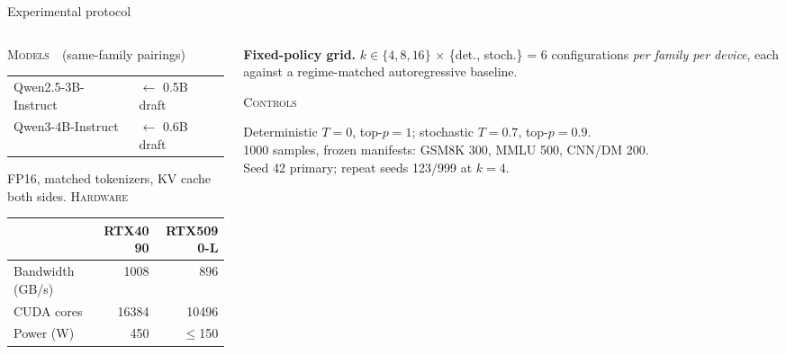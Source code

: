 \documentclass[aspectratio=169, 11pt]{beamer}
\begin{document}
\begin{frame}{Experimental protocol}
  \begin{columns}[T,onlytextwidth]
    \begin{column}{0.47\textwidth}
      {\footnotesize\color{ink2}\textsc{Models}\ \ (same-family pairings)}\par
      \vskip4pt
      {\small
      \begin{tabular}{@{}ll@{}}
        Qwen2.5-3B-Instruct & $\leftarrow$ 0.5B draft\\
        Qwen3-4B-Instruct   & $\leftarrow$ 0.6B draft\\
      \end{tabular}}\par
      \vskip3pt
      {\footnotesize\color{ink2}FP16, matched tokenizers, KV cache both sides.}
      \vskip11pt
      {\footnotesize\color{ink2}\textsc{Hardware}}\par
      \vskip4pt
      {\small
      \begin{tabular}{@{}l@{\hskip 8pt}N@{\hskip 8pt}N@{}}
        \toprule
                          & \textbf{RTX4090} & \textbf{RTX5090-L}\\
        \midrule
        Bandwidth (GB/s)  & 1008 & 896\\
        CUDA cores        & 16384 & 10496\\
        Power (W)         & 450 & $\leq$150\\
        \bottomrule
      \end{tabular}}
    \end{column}
    \begin{column}{0.50\textwidth}
      \begin{takeaway}
        \textbf{Fixed-policy grid.} $k \in \{4,8,16\}$ $\times$ \{det., stoch.\}
        = 6 configurations \emph{per family per device}, each against a
        \alert{regime-matched} autoregressive baseline.
      \end{takeaway}
      \vskip9pt
      {\footnotesize\color{ink2}\textsc{Controls}}\par
      \vskip4pt
      {\footnotesize\raggedright
      Deterministic $T{=}0$, top-$p{=}1$; stochastic $T{=}0.7$, top-$p{=}0.9$.\\
      1000 samples, frozen manifests: GSM8K 300, MMLU 500, CNN/DM 200.\\
      Seed 42 primary; repeat seeds 123/999 at $k{=}4$.\par}
    \end{column}
  \end{columns}
\end{frame}
\end{document}
